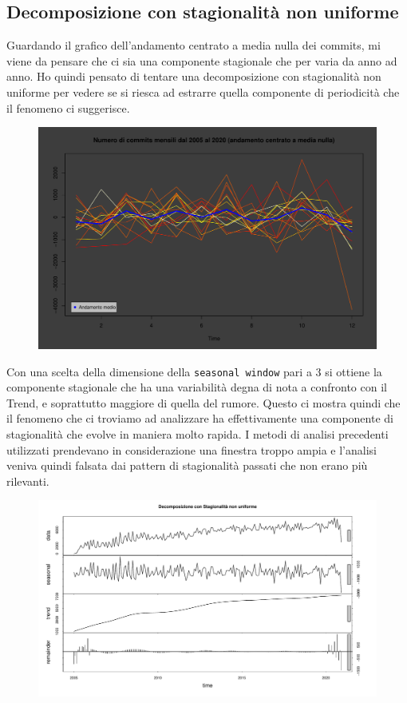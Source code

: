 \documentclass[11pt,a4paper]{article}
\begin{document}
\subsection{Decomposizione con stagionalit\`a non uniforme}
Guardando il grafico dell'andamento centrato a media nulla dei commits, mi viene
da pensare che ci sia una componente stagionale che per varia da anno ad anno.
Ho quindi pensato di tentare una decomposizione con stagionalit\`a non uniforme
per vedere se si riesca ad estrarre quella componente di periodicit\`a che il
fenomeno ci suggerisce.
\clearpage
\begin{figure}[H]
\begin{center}
	\vspace{-1.5cm}
	\includegraphics[scale=0.5]{imgs/heat_colors.pdf}
\end{center}
\end{figure}
\noindent
Con una scelta della dimensione della \texttt{seasonal window} pari a 3 si
ottiene la componente stagionale che ha una variabilit\`a degna di nota a
confronto con il Trend, e soprattutto maggiore di quella del rumore.
Questo ci mostra quindi che il fenomeno che ci troviamo ad analizzare ha
effettivamente una componente di stagionalit\`a che evolve in maniera molto
rapida. I metodi di analisi precedenti utilizzati prendevano in considerazione
una finestra troppo ampia e l'analisi veniva quindi falsata dai pattern di
stagionalit\`a passati che non erano pi\`u rilevanti.
\begin{figure}[H]
	\vspace{-0.5cm}
	\hspace{-1.5cm}
	\includegraphics[scale=0.7]{imgs/stl.pdf}
\end{figure}
\clearpage
\end{document}
